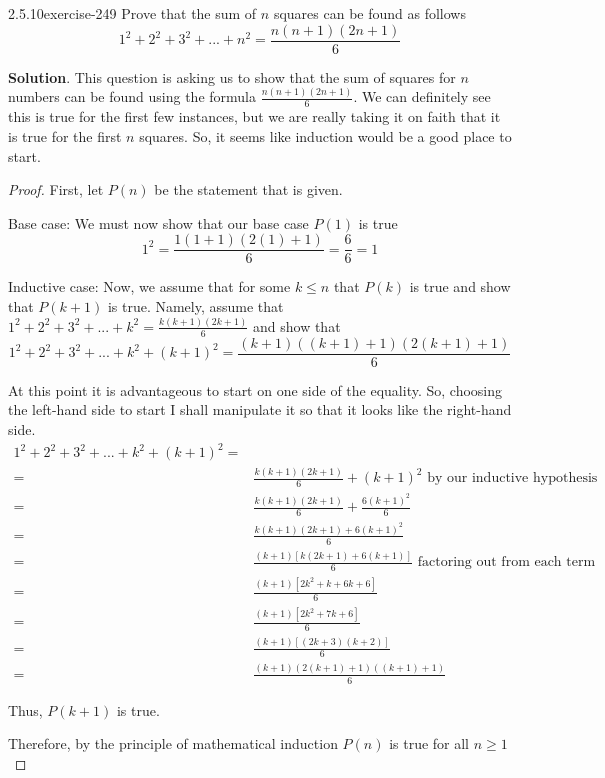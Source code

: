 \documentclass[twoside,11pt,]{book}
\numberwithin{equation}{chapter}
\newcommand{\amp}{&}
\begin{document}
\begin{divisionsolution}{2.5.10}{}{exercise-249}%
\hypertarget{p-3622}{}%
Prove that the sum of \(n\) squares can be found as follows%
\begin{equation*}
1^2 +2^2 +3^2+...+n^2 = \frac{n(n+1)(2n+1)}{6}
\end{equation*}
%
\par\smallskip%
\noindent\textbf{Solution}.\quad%
\hypertarget{p-3623}{}%
This question is asking us to show that the sum of squares for \(n\) numbers can be found using the formula \(\frac{n(n+1)(2n+1)}{6}\). We can definitely see this is true for the first few instances, but we are really taking it on faith that it is true for the first \(n\) squares. So, it seems like induction would be a good place to start.%
\begin{proof}{}
\hypertarget{p-3624}{}%
First, let \(P(n)\) be the statement that is given.%
\par
\hypertarget{p-3625}{}%
Base case: We must now show that our base case \(P(1)\) is true%
\begin{equation*}
1^2 = \frac{1(1+1)(2(1)+1)}{6} = \frac{6}{6} =1
\end{equation*}
%
\par
\hypertarget{p-3626}{}%
Inductive case: Now, we assume that for some \(k\leq n\) that \(P(k)\) is true and show that \(P(k+1)\) is true. Namely, assume that \(1^2 +2^2 +3^2+...+k^2 = \frac{k(k+1)(2k+1)}{6}\) and show that%
\begin{equation*}
1^2 +2^2 +3^2+...+k^2+{(k+1)}^2 = \frac{(k+1)((k+1)+1)(2(k+1)+1)}{6}
\end{equation*}
%
\par
\hypertarget{p-3627}{}%
At this point it is advantageous to start on one side of the equality. So, choosing the left-hand side to start I shall manipulate it so that it looks like the right-hand side.%
\begin{align*}
1^2 +2^2 +3^2+...+k^2+{(k+1)}^2 =\\
= \amp \frac{k(k+1)(2k+1)}{6} +(k+1)^2 \mbox{ by our inductive hypothesis}\\
= \amp \frac{k(k+1)(2k+1)}{6} +\frac{6(k+1)^2}{6}\\
= \amp \frac{k(k+1)(2k+1)+6(k+1)^2}{6}\\
= \amp \frac{(k+1)[k(2k+1)+6(k+1)]}{6} \mbox{ factoring out  from each term}\\
= \amp \frac{(k+1)[2k^2+k+6k+6]}{6}\\
= \amp \frac{(k+1)[2k^2+7k+6]}{6}\\
= \amp \frac{(k+1)[(2k+3)(k+2)]}{6}\\
= \amp \frac{(k+1)(2(k+1)+1)((k+1)+1)}{6}
\end{align*}
%
\par
\hypertarget{p-3628}{}%
Thus, \(P(k+1)\) is true.%
\par
\hypertarget{p-3629}{}%
Therefore, by the principle of mathematical induction \(P(n)\) is true for all \(n \geq 1\)%
\end{proof}
\end{divisionsolution}%
\end{document}
